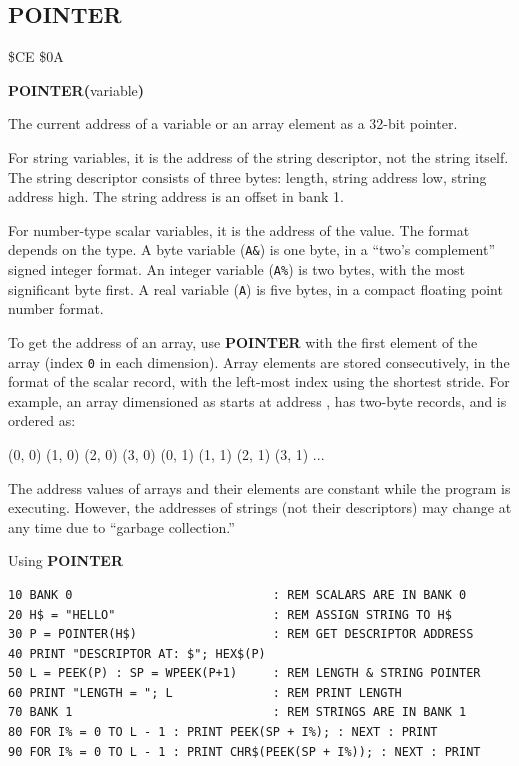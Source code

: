 \subsection{POINTER}
\begin{description}[leftmargin=2cm,style=nextline]
\item [Token:]    \$CE \$0A

\item [Format:]   {\bf POINTER(}variable{\bf)}

\item [Returns:]  The current address of a variable or an array element as a 32-bit pointer.

                  For string variables, it is the address of the string descriptor, not the string itself. The string descriptor consists of three bytes: length, string address low, string address high. The string address is an offset in bank 1.

                  For number-type scalar variables, it is the address of the value. The format depends on the type. A byte variable ({\tt A\&}) is one byte, in a ``two's complement'' signed integer format. An integer variable ({\tt A\%}) is two bytes, with the most significant byte first. A real variable ({\tt A}) is five bytes, in a compact floating point number format.

                  To get the address of an array, use {\bf POINTER} with the first element of the array (index {\tt 0} in each dimension). Array elements are stored consecutively, in the format of the scalar record, with the left-most index using the shortest stride. For example, an array dimensioned as  starts at address , has two-byte records, and is ordered as:

                  (0, 0)  (1, 0)  (2, 0)  (3, 0)  (0, 1)  (1, 1)  (2, 1)  (3, 1) ...

\item [Remarks:]  The address values of arrays and their elements are constant while the program is executing. However, the addresses of strings (not their descriptors) may change at any time due to ``garbage collection.''

\item [Example:]  Using {\bf POINTER}

\begin{tcolorbox}[colback=black,coltext=white]
\verbatimfont{\codefont}
\begin{verbatim}
10 BANK 0                            : REM SCALARS ARE IN BANK 0
20 H$ = "HELLO"                      : REM ASSIGN STRING TO H$
30 P = POINTER(H$)                   : REM GET DESCRIPTOR ADDRESS
40 PRINT "DESCRIPTOR AT: $"; HEX$(P)
50 L = PEEK(P) : SP = WPEEK(P+1)     : REM LENGTH & STRING POINTER
60 PRINT "LENGTH = "; L              : REM PRINT LENGTH
70 BANK 1                            : REM STRINGS ARE IN BANK 1
80 FOR I% = 0 TO L - 1 : PRINT PEEK(SP + I%); : NEXT : PRINT
90 FOR I% = 0 TO L - 1 : PRINT CHR$(PEEK(SP + I%)); : NEXT : PRINT


\end{verbatim}
\end{tcolorbox}
\end{description}
